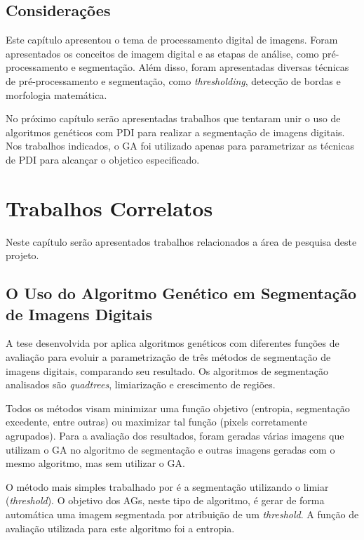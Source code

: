 \documentclass[12pt,oneside,a4paper,english,french,spanish,brazil,]{abntex2}
\begin{document}
\section{Considerações}

Este capítulo apresentou o tema de processamento digital de imagens. Foram apresentados os conceitos de imagem digital e as etapas de análise, como pré-processamento e segmentação. Além disso, foram apresentadas diversas técnicas de pré-processamento e segmentação, como \textit{thresholding}, detecção de bordas e morfologia matemática.

No próximo capítulo serão apresentadas trabalhos que tentaram unir o uso de algoritmos genéticos com PDI para realizar a segmentação de imagens digitais. Nos trabalhos indicados, o GA foi utilizado apenas para parametrizar as técnicas de PDI para alcançar o objetico especificado.

\chapter{Trabalhos Correlatos}
\label{chap:TrabalhosCorrelatos}

Neste capítulo serão apresentados trabalhos relacionados a área de pesquisa deste projeto.


\section{O Uso do Algoritmo Genético em Segmentação de Imagens Digitais}

A tese desenvolvida por \citet{matias:2007} aplica algoritmos genéticos com diferentes funções de avaliação para evoluir a parametrização de três métodos de segmentação de imagens digitais, comparando seu resultado. Os algoritmos de segmentação analisados são \textit{quadtrees}, limiarização e crescimento de regiões.

Todos os métodos visam minimizar uma função objetivo (entropia, segmentação excedente, entre outras) ou maximizar tal função (pixels corretamente agrupados). Para a avaliação dos resultados, foram geradas várias imagens que utilizam o GA no algoritmo de segmentação e outras imagens geradas com o mesmo algoritmo, mas sem utilizar o GA. 

O método mais simples trabalhado por \citet{matias:2007} é a segmentação utilizando o limiar (\textit{threshold}). O objetivo dos AGs, neste tipo de algoritmo, é gerar de forma automática uma imagem segmentada por atribuição de um \textit{threshold}. A função de avaliação utilizada para este algoritmo foi a entropia.
\end{document}
